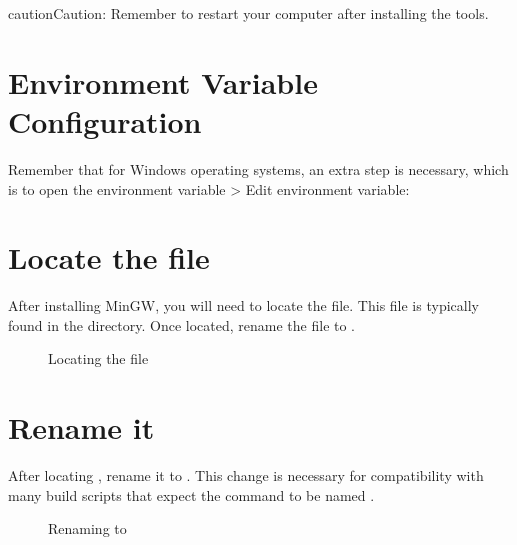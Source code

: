 \documentclass[letterpaper,10pt,english]{sphinxmanual}
\begin{document}
\begin{sphinxadmonition}{caution}{Caution:}
\sphinxAtStartPar
Remember to restart your computer after installing the tools.
\end{sphinxadmonition}


\section{Environment Variable Configuration}
\label{\detokenize{install_windows:environment-variable-configuration}}
\sphinxAtStartPar
Remember that for Windows operating systems, an extra step is necessary, which is to open the environment variable \sphinxhyphen{}\textgreater{} Edit environment variable:

\begin{sphinxVerbatim}[commandchars=\\\{\}]
\PYGZbs{}\PYGZbs{}
\end{sphinxVerbatim}


\section{Locate the file}
\label{\detokenize{install_windows:locate-the-file}}
\sphinxAtStartPar
After installing MinGW, you will need to locate the  file. This file is typically found in the  directory. Once located, rename the file to .

\begin{figure}[htbp]
\centering
\capstart

\noindent{}
\caption{Locating the  file}\label{\detokenize{install_windows:id3}}\label{\detokenize{install_windows:make-file}}\end{figure}


\section{Rename it}
\label{\detokenize{install_windows:rename-it}}
\sphinxAtStartPar
After locating , rename it to . This change is necessary for compatibility with many build scripts that expect the command to be named .

\begin{figure}[htbp]
\centering
\capstart

\noindent{}
\caption{Renaming  to }\label{\detokenize{install_windows:id4}}\label{\detokenize{install_windows:rename}}\end{figure}
\end{document}
